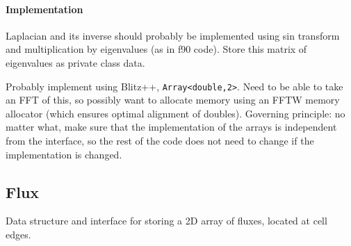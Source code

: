 \documentclass[11pt]{article}
\let\code\lstinline
\begin{document}
\paragraph{Implementation}
Laplacian and its inverse should probably be implemented using sin transform and multiplication by eigenvalues (as in f90 code).  Store this matrix of eigenvalues as private class data.

Probably implement using Blitz++, \code|Array<double,2>|.  Need to be able to take an FFT of this, so possibly want to allocate memory using an FFTW memory allocator (which ensures optimal alignment of doubles).  Governing principle: no matter what, make sure that the implementation of the arrays is independent from the interface, so the rest of the code does not need to change if the implementation is changed.

\subsection{Flux}
Data structure and interface for storing a 2D array of fluxes, located at cell edges.
\end{document}
